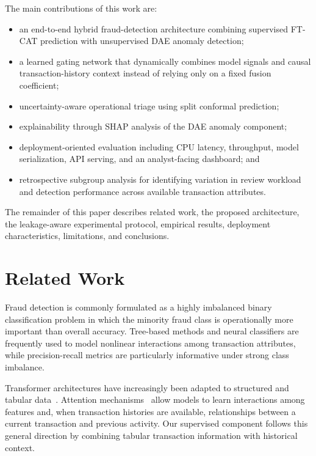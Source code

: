 \documentclass[conference]{IEEEtran}
\begin{document}
The main contributions of this work are:
\begin{itemize}
    \item an end-to-end hybrid fraud-detection architecture combining supervised
    FT-CAT prediction with unsupervised DAE anomaly detection;
    \item a learned gating network that dynamically combines model signals and
    causal transaction-history context instead of relying only on a fixed
    fusion coefficient;
    \item uncertainty-aware operational triage using split conformal prediction;
    \item explainability through SHAP analysis of the DAE anomaly component;
    \item deployment-oriented evaluation including CPU latency, throughput,
    model serialization, API serving, and an analyst-facing dashboard; and
    \item retrospective subgroup analysis for identifying variation in review
    workload and detection performance across available transaction attributes.
\end{itemize}

The remainder of this paper describes related work, the proposed architecture,
the leakage-aware experimental protocol, empirical results, deployment
characteristics, limitations, and conclusions.

\section{Related Work}
\label{sec:related}

Fraud detection is commonly formulated as a highly imbalanced binary
classification problem in which the minority fraud class is operationally more
important than overall accuracy. Tree-based methods and neural classifiers are
frequently used to model nonlinear interactions among transaction attributes,
while precision-recall metrics are particularly informative under strong class
imbalance.

Transformer architectures have increasingly been adapted to structured and
tabular data~\cite{gorishniy2021revisiting}. Attention
mechanisms~\cite{vaswani2017attention} allow models to learn interactions among
features and, when transaction histories are available, relationships between a
current transaction and previous activity. Our supervised component follows this
general direction by combining tabular transaction information with historical
context.
\end{document}
